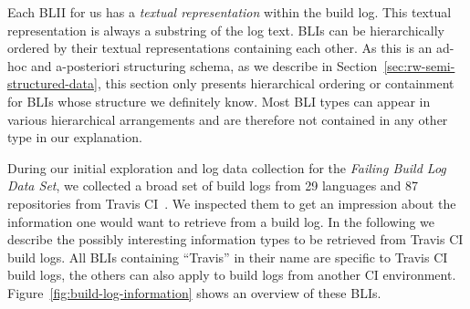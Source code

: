 \documentclass[\myrootdir/main.tex]{subfiles}
\begin{document}
Each BLII for us has a \emph{textual representation} within the build log.
This textual representation is always a substring of the log text.
BLIs can be hierarchically ordered by their textual representations containing each other.
As this is an ad-hoc and a-posteriori structuring schema, as we describe in Section~\ref{sec:rw-semi-structured-data}, this section only presents hierarchical ordering or containment for BLIs whose structure we definitely know.
Most BLI types can appear in various hierarchical arrangements and are therefore not contained in any other type in our explanation.

During our initial exploration and log data collection for the \emph{Failing Build Log Data Set}, we collected a broad set of build logs from 29 languages and 87 repositories from Travis CI~\cite{travisci2019webpage}.
We inspected them to get an impression about the information one would want to retrieve from a build log.
In the following we describe the possibly interesting information types to be retrieved from Travis CI build logs.
All BLIs containing ``Travis'' in their name are specific to Travis CI build logs, the others can also apply to build logs from another CI environment.
Figure~\ref{fig:build-log-information} shows an overview of these BLIs.
\end{document}

